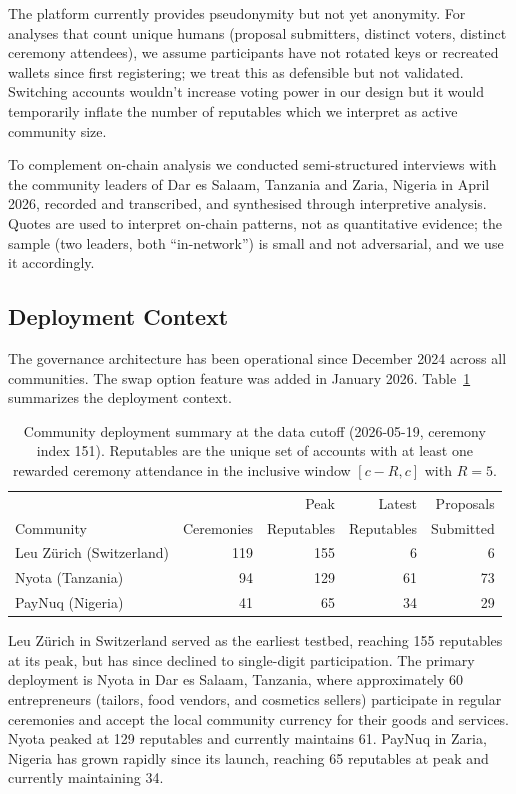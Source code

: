 \documentclass{svproc}
\newcommand{\locationC}{Dar es Salaam, Tanzania\xspace}
\newcommand{\locationD}{Zaria, Nigeria\xspace}
\begin{document}
The platform currently provides pseudonymity but not yet anonymity. For analyses that count unique humans (proposal submitters, distinct voters, distinct ceremony attendees), we assume participants have not rotated keys or recreated wallets since first registering; we treat this as defensible but not validated. Switching accounts wouldn't increase voting power in our design but it would temporarily inflate the number of reputables which we interpret as active community size.

To complement on-chain analysis we conducted semi-structured interviews with the community leaders of \locationC and \locationD in April 2026, recorded and transcribed, and synthesised through interpretive analysis. Quotes are used to interpret on-chain patterns, not as quantitative evidence; the sample (two leaders, both ``in-network'') is small and not adversarial, and we use it accordingly.

\subsection{Deployment Context}
\label{sec:deployments}

The governance architecture has been operational since December 2024 across all communities. The swap option feature was added in January 2026. Table~\ref{tab:communities} summarizes the deployment context.

\begin{table}[t]
\centering
\caption{Community deployment summary at the data cutoff (2026-05-19, ceremony index 151). Reputables are the unique set of accounts with at least one rewarded ceremony attendance in the inclusive window $[c - R, c]$ with $R = 5$.}
\label{tab:communities}
\begin{tabular}{lrrrr}
\toprule
 & & Peak & Latest & Proposals \\
Community & Ceremonies & Reputables & Reputables & Submitted \\
\midrule
Leu Z\"urich (Switzerland) & 119 & 155 & 6 & 6 \\
Nyota (Tanzania) & 94 & 129 & 61 & 73 \\
PayNuq (Nigeria) & 41 & 65 & 34 & 29 \\
\bottomrule
\end{tabular}
\end{table}

Leu Z\"urich in Switzerland served as the earliest testbed, reaching 155 reputables at its peak, but has since declined to single-digit participation. The primary deployment is Nyota in \locationC, where approximately 60 entrepreneurs (tailors, food vendors, and cosmetics sellers) participate in regular ceremonies and accept the local community currency for their goods and services. Nyota peaked at 129 reputables and currently maintains 61. PayNuq in \locationD has grown rapidly since its launch, reaching 65 reputables at peak and currently maintaining 34.
\end{document}

